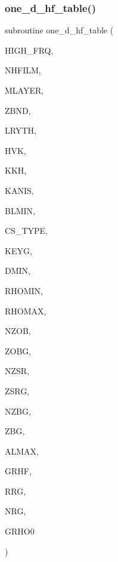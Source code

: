\subsubsection{\texorpdfstring{one\+\_\+d\+\_\+hf\+\_\+table()}{one\_d\_hf\_table()}}
{\footnotesize\ttfamily subroutine one\+\_\+d\+\_\+hf\+\_\+table (\begin{DoxyParamCaption}\item[{integer, intent(in)}]{H\+I\+G\+H\+\_\+\+F\+RQ,  }\item[{integer, intent(in)}]{N\+H\+F\+I\+LM,  }\item[{integer, intent(in)}]{M\+L\+A\+Y\+ER,  }\item[{real, dimension(0\+:mlayer), intent(in)}]{Z\+B\+ND,  }\item[{real, dimension(mlayer), intent(in)}]{L\+R\+Y\+TH,  }\item[{real, dimension(0\+:mlayer), intent(in)}]{H\+VK,  }\item[{complex, dimension(0\+:mlayer), intent(in)}]{K\+KH,  }\item[{integer, intent(in)}]{K\+A\+N\+IS,  }\item[{real, intent(in)}]{B\+L\+M\+IN,  }\item[{integer, intent(in)}]{C\+S\+\_\+\+T\+Y\+PE,  }\item[{integer, intent(in)}]{K\+E\+YG,  }\item[{real, intent(in)}]{D\+M\+IN,  }\item[{real, intent(in)}]{R\+H\+O\+M\+IN,  }\item[{real, intent(in)}]{R\+H\+O\+M\+AX,  }\item[{integer, intent(in)}]{N\+Z\+OB,  }\item[{real, dimension(nzob), intent(in)}]{Z\+O\+BG,  }\item[{integer, intent(in)}]{N\+Z\+SR,  }\item[{real, dimension(2,nzsr), intent(in)}]{Z\+S\+RG,  }\item[{integer, intent(in)}]{N\+Z\+BG,  }\item[{real, dimension(2,nzbg), intent(inout)}]{Z\+BG,  }\item[{real, intent(in)}]{A\+L\+M\+AX,  }\item[{complex, dimension(11,nhfilm,nzsr,nzob), intent(inout)}]{G\+R\+HF,  }\item[{real, dimension(nhfilm), intent(inout)}]{R\+RG,  }\item[{integer, intent(inout)}]{N\+RG,  }\item[{complex, dimension(4,nzsr,nzob), intent(inout)}]{G\+R\+H\+O0 }\end{DoxyParamCaption})}

